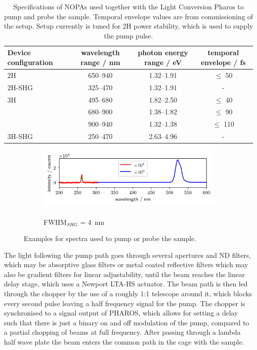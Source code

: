 \documentclass[twoside,openright]{scrreprt}
\begin{document}
\begin{table}
\caption{Specifications of NOPAs used together with the Light Conversion Pharos to pump and probe the sample. Temporal envelope values are from commissioning of the setup. Setup currently is tuned for 2H power stability, which is used to supply the pump pulse.\label{tab:NOPAs}}
\begin{tabular}{lccc}\toprule
Device configuration & wavelength range / nm & photon energy range / eV & temporal envelope / fs \\ \midrule
2H & \SIrange{650}{940}{} & \SIrange{1.32}{1.91}{} & $\leq$ 50 \\ 
2H-SHG & \SIrange{325}{470}{} & \SIrange{1.32}{1.91}{} & - \\\midrule
3H & \SIrange{495}{680}{} & \SIrange{1.82}{2.50}{} & $\leq$ 40 \\
& \SIrange{680}{900}{} & \SIrange{1.38}{1.82}{} & $\leq$ 90 \\
& \SIrange{900}{940}{} & \SIrange{1.32}{1.38}{} & $\leq$ 110 \\
3H-SHG& \SIrange{250}{470}{} & \SIrange{2.63}{4.96}{} & - \\
\end{tabular}
\end{table}

\begin{figure}[hbtp]
\begin{subfigure}[b]{\textwidth}
\centering
\includegraphics[scale=1]{images/spectra/SpectrumExampleNoFilter_260nm.png}
\caption{\\ FWHM$_{SHG}$ = \SI{4}{\nano\meter}}
\end{subfigure}
\caption{Examples for spectra used to pump or probe the sample.}
\end{figure}



The light following the pump path goes through several apertures and ND filters, which may be absorptive glass filters or metal coated reflective filters which may also be gradient filters for linear adjustability, until the beam reaches the linear delay stage, which uses a Newport LTA-HS actuator. The beam path is then led through the chopper by the use of a roughly 1:1 telescope around it, which blocks every second pulse leaving a half frequency signal for the pump. The chopper is synchronised to a signal output of PHAROS, which allows for setting a delay such that there is just a binary on and off modulation of the pump, compared to a partial chopping of beams at full frequency. After passing through a lambda half wave plate the beam enters the common path in the cage with the sample.
\end{document}

